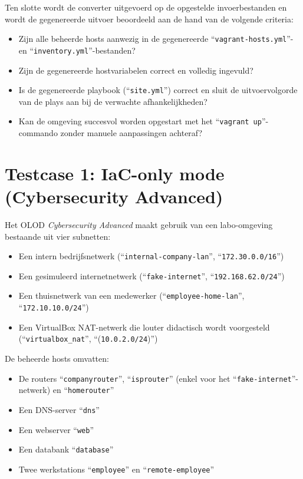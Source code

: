 Ten slotte wordt de converter uitgevoerd op de opgestelde invoerbestanden en wordt de gegenereerde uitvoer beoordeeld aan de hand van de volgende criteria:
\begin{itemize}
    \item Zijn alle beheerde hosts aanwezig in de gegenereerde ``\texttt{vagrant-hosts.yml}''- en ``\texttt{inventory.yml}''-bestanden?
    \item Zijn de gegenereerde hostvariabelen correct en volledig ingevuld?
    \item Is de gegenereerde playbook (``\texttt{site.yml}'') correct en sluit de uitvoervolgorde van de plays aan bij de verwachte afhankelijkheden?
    \item Kan de omgeving succesvol worden opgestart met het ``\texttt{vagrant up}''-commando zonder manuele aanpassingen achteraf?
\end{itemize}

\section{Testcase 1: IaC-only mode (Cybersecurity Advanced)}%
\label{sec:testcase1}

Het OLOD \emph{Cybersecurity Advanced} maakt gebruik van een labo-omgeving bestaande uit vier subnetten:

\begin{itemize}
    \item Een intern bedrijfsnetwerk (``\texttt{internal-company-lan}'', ``\texttt{172.30.0.0/16}'')
    \item Een gesimuleerd internetnetwerk (``\texttt{fake-internet}'', ``\texttt{192.168.62.0/24}'')
    \item Een thuisnetwerk van een medewerker (``\texttt{employee-home-lan}'', \\``\texttt{172.10.10.0/24}'')
    \item Een VirtualBox NAT-netwerk die louter didactisch wordt voorgesteld (``\texttt{virtualbox\_nat}'', ``(\texttt{10.0.2.0/24})'')
\end{itemize}

De beheerde hosts omvatten:

\begin{itemize}
    \item De routers ``\texttt{companyrouter}'', ``\texttt{isprouter}'' (enkel voor het ``\texttt{fake-internet}''-netwerk) en ``\texttt{homerouter}''
    \item Een DNS-server ``\texttt{dns}''
    \item Een webserver ``\texttt{web}''
    \item Een databank ``\texttt{database}''
    \item Twee werkstations ``\texttt{employee}'' en ``\texttt{remote-employee}''
\end{itemize}

